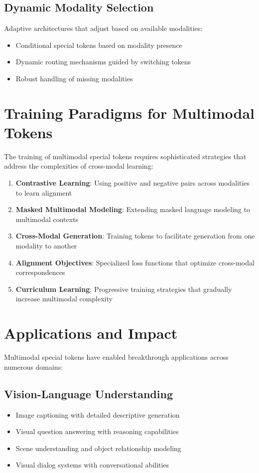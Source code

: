 \subsection{Dynamic Modality Selection}
Adaptive architectures that adjust based on available modalities:
\begin{itemize}
\item Conditional special tokens based on modality presence
\item Dynamic routing mechanisms guided by switching tokens
\item Robust handling of missing modalities
\end{itemize}

\section{Training Paradigms for Multimodal Tokens}

The training of multimodal special tokens requires sophisticated strategies that address the complexities of cross-modal learning:

\begin{enumerate}
\item \textbf{Contrastive Learning}: Using positive and negative pairs across modalities to learn alignment
\item \textbf{Masked Multimodal Modeling}: Extending masked language modeling to multimodal contexts
\item \textbf{Cross-Modal Generation}: Training tokens to facilitate generation from one modality to another
\item \textbf{Alignment Objectives}: Specialized loss functions that optimize cross-modal correspondences
\item \textbf{Curriculum Learning}: Progressive training strategies that gradually increase multimodal complexity
\end{enumerate}

\section{Applications and Impact}

Multimodal special tokens have enabled breakthrough applications across numerous domains:

\subsection{Vision-Language Understanding}
\begin{itemize}
\item Image captioning with detailed descriptive generation
\item Visual question answering with reasoning capabilities
\item Scene understanding and object relationship modeling
\item Visual dialog systems with conversational abilities
\end{itemize}

